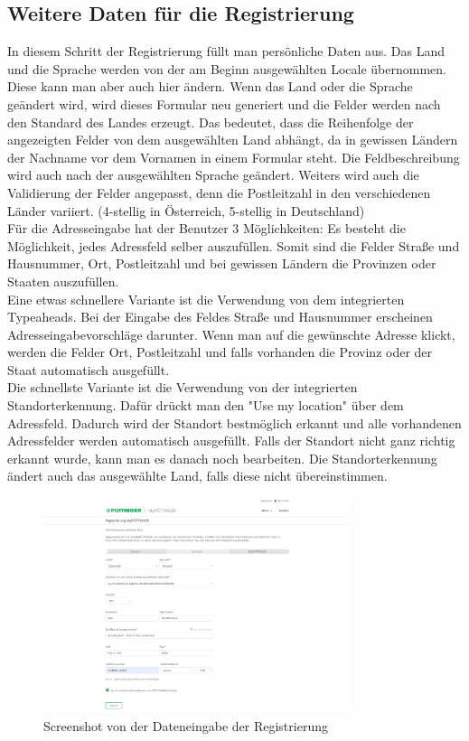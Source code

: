 \subsection{Weitere Daten für die Registrierung}

In diesem Schritt der Registrierung füllt man persönliche Daten aus. Das Land und die Sprache werden von der am Beginn ausgewählten Locale übernommen. Diese kann man aber auch hier ändern. Wenn das Land oder die Sprache geändert wird, wird dieses Formular neu generiert und die Felder werden nach den Standard des Landes erzeugt. Das bedeutet, dass die Reihenfolge der angezeigten Felder von dem ausgewählten Land abhängt, da in gewissen Ländern der Nachname vor dem Vornamen in einem Formular steht. Die Feldbeschreibung wird auch nach der ausgewählten Sprache geändert. Weiters wird auch die Validierung der Felder angepasst, denn die Postleitzahl in den verschiedenen Länder variiert. (4-stellig in Österreich, 5-stellig in Deutschland)\\

Für die Adresseingabe hat der Benutzer 3 Möglichkeiten:
Es besteht die Möglichkeit, jedes Adressfeld selber auszufüllen. Somit sind die Felder Straße und Hausnummer, Ort, Postleitzahl und bei gewissen Ländern die Provinzen oder Staaten auszufüllen.\\

Eine etwas schnellere Variante ist die Verwendung von dem integrierten Typeaheads. Bei der Eingabe des Feldes Straße und Hausnummer erscheinen Adresseingabevorschläge darunter. Wenn man auf die gewünschte Adresse klickt, werden die Felder Ort, Postleitzahl und falls vorhanden die Provinz oder der Staat automatisch ausgefüllt.\\

Die schnellste Variante ist die Verwendung von der integrierten Standorterkennung. Dafür drückt man den "Use my location" über dem Adressfeld. Dadurch wird der Standort bestmöglich erkannt und alle vorhandenen Adressfelder werden automatisch ausgefüllt. Falls der Standort nicht ganz richtig erkannt wurde, kann man es danach noch bearbeiten. Die Standorterkennung ändert auch das ausgewählte Land, falls diese nicht übereinstimmen.

\begin{figure}[H]
	\centerline{
		\includegraphics[width=0.8\textwidth]{./grafiken/erm_register_data.png}
	}
	\vskip0pt
	\caption{Screenshot von der Dateneingabe der Registrierung} \label{fig:register2}
\end{figure}

